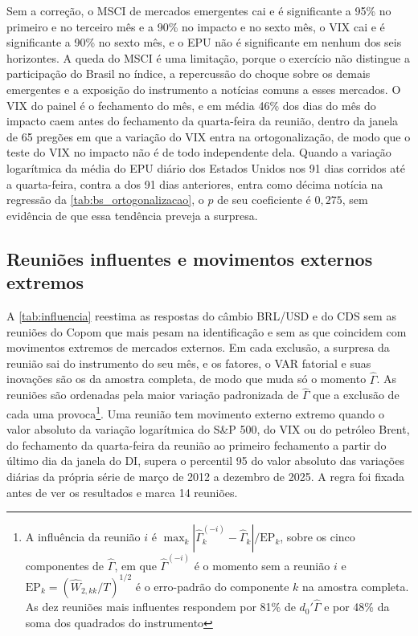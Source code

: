 \documentclass[preprint,authoryear,review,12pt]{elsarticle}
\begin{document}
Sem a correção, o MSCI de mercados emergentes cai e é significante a 95\% no primeiro e no terceiro mês e a 90\% no impacto e no sexto mês, o VIX cai e é significante a 90\% no sexto mês, e o EPU não é significante em nenhum dos seis horizontes. A queda do MSCI é uma limitação, porque o exercício não distingue a participação do Brasil no índice, a repercussão do choque sobre os demais emergentes e a exposição do instrumento a notícias comuns a esses mercados. O VIX do painel é o fechamento do mês, e em média 46\% dos dias do mês do impacto caem antes do fechamento da quarta-feira da reunião, dentro da janela de 65 pregões em que a variação do VIX entra na ortogonalização, de modo que o teste do VIX no impacto não é de todo independente dela. Quando a variação logarítmica da média do EPU diário dos Estados Unidos nos 91 dias corridos até a quarta-feira, contra a dos 91 dias anteriores, entra como décima notícia na regressão da \autoref{tab:bs_ortogonalizacao}, o $p$ de seu coeficiente é $0{,}275$, sem evidência de que essa tendência preveja a surpresa.

\subsection{Reuniões influentes e movimentos externos extremos}
\label{sec:influencia}

A \autoref{tab:influencia} reestima as respostas do câmbio BRL/USD e do CDS sem as reuniões do Copom que mais pesam na identificação e sem as que coincidem com movimentos extremos de mercados externos. Em cada exclusão, a surpresa da reunião sai do instrumento do seu mês, e os fatores, o VAR fatorial e suas inovações são os da amostra completa, de modo que muda só o momento $\hat{\Gamma}$. As reuniões são ordenadas pela maior variação padronizada de $\hat{\Gamma}$ que a exclusão de cada uma provoca\footnote{A influência da reunião $i$ é $\max_k |\hat{\Gamma}^{(-i)}_k - \hat{\Gamma}_k| / \mathrm{EP}_k$, sobre os cinco componentes de $\hat{\Gamma}$, em que $\hat{\Gamma}^{(-i)}$ é o momento sem a reunião $i$ e $\mathrm{EP}_k = (\hat{W}_{2,kk}/T)^{1/2}$ é o erro-padrão do componente $k$ na amostra completa. As dez reuniões mais influentes respondem por 81\% de $d_0'\hat{\Gamma}$ e por 48\% da soma dos quadrados do instrumento}. Uma reunião tem movimento externo extremo quando o valor absoluto da variação logarítmica do S\&P 500, do VIX ou do petróleo Brent, do fechamento da quarta-feira da reunião ao primeiro fechamento a partir do último dia da janela do DI, supera o percentil 95 do valor absoluto das variações diárias da própria série de março de 2012 a dezembro de 2025. A regra foi fixada antes de ver os resultados e marca 14 reuniões.
\end{document}
